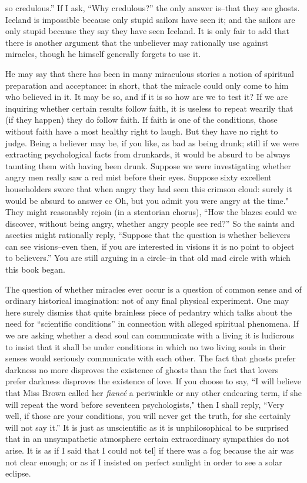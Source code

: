 \documentclass{book}
\begin{document}
so credulous.” If I ask, “Why credulous?” the only answer is–that they see ghosts. Iceland is impossible because only stupid sailors have seen it; and the sailors are only stupid because they say they have seen Iceland. It is only fair to add that there is another argument that the unbeliever may rationally use against miracles, though he himself generally forgets to use it.

He may say that there has been in many miraculous stories a notion of spiritual preparation and acceptance: in short, that the miracle could only come to him who believed in it. It may be so, and if it is so how are we to test it? If we are inquiring whether certain results follow faith, it is useless to repeat wearily that (if they happen) they do follow faith. If faith is one of the conditions, those without faith have a most healthy right to laugh. But they have no right to judge. Being a believer may be, if you like, as bad as being drunk; still if we were extracting psychological facts from drunkards, it would be absurd to be always taunting them with having been drunk. Suppose we were investigating whether angry men really saw a red mist before their eyes. Suppose sixty excellent householders swore that when angry they had seen this crimson cloud: surely it would be absurd to answer cc Oh, but you admit you were angry at the time." They might reasonably rejoin (in a stentorian chorus), “How the blazes could we discover, without being angry, whether angry people see red?” So the saints and ascetics might rationally reply, “Suppose that the question is whether believers can see visions–even then, if you are interested in visions it is no point to object to believers.” You are still arguing in a circle–in that old mad circle with which this book began.

The question of whether miracles ever occur is a question of common sense and of ordinary historical imagination: not of any final physical experiment. One may here surely dismiss that quite brainless piece of pedantry which talks about the need for “scientific conditions” in connection with alleged spiritual phenomena. If we are asking whether a dead soul can communicate with a living it is ludicrous to insist that it shall be under conditions in which no two living souls in their senses would seriously communicate with each other. The fact that ghosts prefer darkness no more disproves the existence of ghosts than the fact that lovers prefer darkness disproves the existence of love. If you choose to say, “I will believe that Miss Brown called her \emph{fiancé} a periwinkle or any other endearing term, if she will repeat the word before seventeen psychologists," then I shall reply, “Very well, if those are your conditions, you will never get the truth, for she certainly will not say it.” It is just as unscientific as it is unphilosophical to be surprised that in an unsympathetic atmosphere certain extraordinary sympathies do not arise. It is as if I said that I could not tel{]} if there was a fog because the air was not clear enough; or as if I insisted on perfect sunlight in order to see a solar eclipse.
\end{document}
